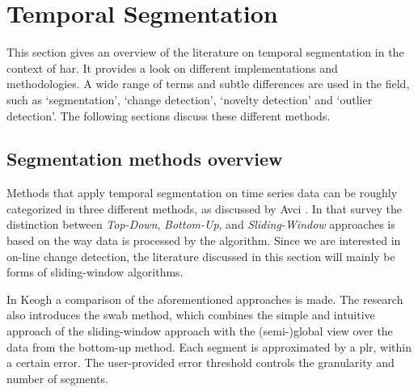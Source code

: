 \section{Temporal Segmentation}\label{sec:literature_review_temporal_segmentation}




This section gives an overview of the literature on temporal segmentation in the context of \gls{har}.
It provides a look on different implementations and methodologies.
A wide range of terms and subtle differences are used in the field, such as `segmentation', `change detection', `novelty detection' and `outlier detection'.
The following sections discuss these different methods.

\subsection{Segmentation methods overview}\label{subsec:segmentation}

Methods that apply temporal segmentation on time series data can be roughly categorized in three different methods, as discussed by Avci \etal \cite{avci2010activity}.
In that survey the distinction between \emph{Top-Down}, \emph{Bottom-Up}, and \emph{Sliding-Window} approaches is based on the way data is processed by the algorithm.
Since we are interested in on-line change detection, the literature discussed in this section will mainly be forms of sliding-window algorithms.

In Keogh \etal \cite{keogh2001online} a comparison of the aforementioned approaches is made.
The research also introduces the \gls{swab} method, which combines the simple and intuitive approach of the sliding-window approach with the (semi-)global view over the data from the bottom-up method.
Each segment is approximated by a \gls{plr}, within a certain error.
The user-provided error threshold controls the granularity and number of segments.

